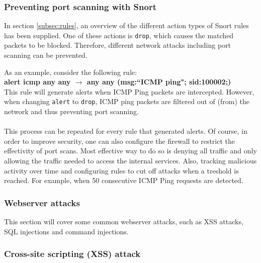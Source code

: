 \subsubsection{Preventing port scanning with Snort}

In section \ref{subsec:rules}, an overview of the different action types of Snort rules has been supplied. One of these actions is \texttt{drop}, which causes the matched packets to be blocked. Therefore, different network attacks including port scanning can be prevented.

As an example, consider the following rule: \\
\textbf{alert icmp any any $\rightarrow$ any any (msg:``ICMP ping"; sid:100002;)} \\
This rule will generate alerts when ICMP Ping packets are intercepted. However, when changing \texttt{alert} to \texttt{drop}, ICMP ping packets are filtered out of (from) the network and thus preventing port scanning. \\ \\
This process can be repeated for every rule that generated alerts. Of course, in order to improve security, one can also configure the firewall to restrict the effectivity of port scans. Most effective way to do so is denying all traffic and only allowing the traffic needed to access the internal services. Also, tracking malicious activity over time and configuring rules to cut off attacks when a treshold is reached. For example, when 50 consecutive ICMP Ping requests are detected.

\subsubsection{Webserver attacks}

This section will cover some common webserver attacks, such as XSS attacks, SQL injections and command injections.

\subsubsection{Cross-site scripting (XSS) attack}

